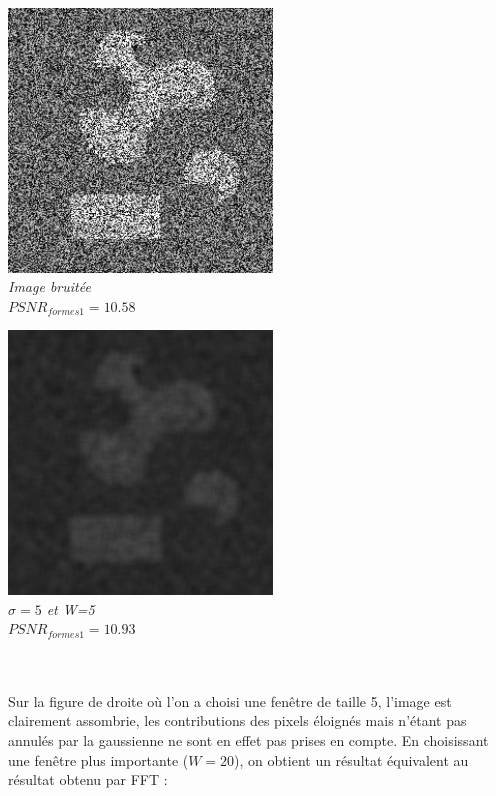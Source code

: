 \documentclass[a4,12pt]{article}
\begin{document}
\noindent
\begin{minipage}[c]{0.50\linewidth}
	\begin{center}
		\includegraphics[width = 70mm]{./img/2sp5.jpg}\\
		\textit{Image bruitée}\\
		\textit{$PSNR_{formes1}=10.58$}
	\end{center}
\end{minipage}
\begin{minipage}[c]{0.50\linewidth}
	\begin{center}
		\includegraphics[width = 70mm]{./img/2sp5-5-5}\\
		\textit{$\sigma=5$ et W=5}\\
		\textit{$PSNR_{formes1}=10.93$}
	\end{center}
\end{minipage}\\
\\

Sur la figure de droite où l'on a choisi une fenêtre de taille 5, l'image est clairement assombrie, les contributions des pixels éloignés mais n'étant pas annulés par la gaussienne ne sont en effet pas prises en compte. En choisissant une fenêtre plus importante ($W = 20$), on obtient un résultat équivalent au résultat obtenu par FFT :\\
\end{document}
